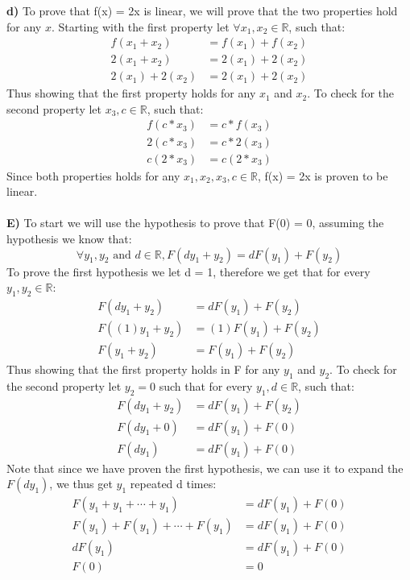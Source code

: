 \documentclass[11pt]{article}
\begin{document}
\textbf{d)} To prove that f(x) = 2x is linear, we will prove that the two properties hold for any $x$. Starting with the first property let $\forall x_{1}, x_{2} \in \mathbb{R}$, such that:
\begin{align*}
f(x_1 + x_2)  &= f(x_1) + f(x_2)\\
2(x_1 + x_2) &= 2(x_1) + 2(x_2)\\
2(x_1) + 2(x_2) &= 2(x_1) + 2(x_2)
\end{align*}
Thus showing that the first property holds for any $x_1$ and $x_2$. To check for the second property let $x_3, c \in \mathbb{R}$, such that:
\begin{align*}
f(c*x_3)  &= c*f(x_3)\\
2(c*x_3)  &= c*2(x_3)\\
c(2*x_3)  &= c(2*x_3)
\end{align*}
Since both properties holds for any $x_1, x_2, x_3, c \in \mathbb{R}$, f(x) = 2x is proven to be linear.\\\\
\textbf{E)} To start we will use the hypothesis to prove that F(0) = 0, assuming the hypothesis we know that:
\[ \forall y_1,y_2 \text{ and }d \in \mathbb{R}, F(dy_1 + y_2) = dF(y_1) + F(y_2) \]
To prove the first hypothesis we let d = 1, therefore we get that for every $y_1, y_2 \in \mathbb{R}$:
\begin{align*}
F(dy_1 + y_2) &= dF(y_1) + F(y_2)\\
F((1)y_1 + y_2) &= (1)F(y_1) + F(y_2)\\
F(y_1 + y_2) &= F(y_1) + F(y_2)
\end{align*}
Thus showing that the first property holds in F for any $y_1$ and $y_2$. To check for the second property let $y_2 = 0$ such that for every $y_1, d \in \mathbb{R}$, such that:
\begin{align*}
F(dy_1 + y_2) &= dF(y_1) + F(y_2)\\
F(dy_1 + 0) &= dF(y_1) + F(0)\\
F(dy_1) &= dF(y_1) + F(0)
\end{align*}
Note that since we have proven the first hypothesis, we can use it to expand the $F(dy_1)$, we thus get $y_1$ repeated d times:
\begin{align*}
F(y_1 + y_1 + \cdots + y_1) &= dF(y_1) + F(0)\\
F(y_1) + F(y_1) + \cdots + F(y_1) &= dF(y_1) + F(0)\\
dF(y_1) &= dF(y_1) + F(0)\\
F(0) &= 0
\end{align*}
\end{document}
